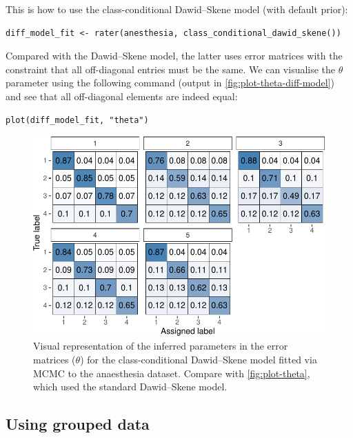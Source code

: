 This is how to use the class-conditional Dawid--Skene model (with default prior):

\begin{verbatim}
diff_model_fit <- rater(anesthesia, class_conditional_dawid_skene())
\end{verbatim}

Compared with the Dawid--Skene model, the latter uses error matrices with the
constraint that all off-diagonal entries must be the same. We can visualise
the \(\theta\) parameter using the following command (output in
\autoref{fig:plot-theta-diff-model}) and see that all off-diagonal elements are
indeed equal:

\begin{verbatim}
plot(diff_model_fit, "theta")
\end{verbatim}

\begin{figure}

{\centering \includegraphics{RJ-2023-064_files/figure-latex/plot-theta-diff-model-1} 

}

\caption{Visual representation of the inferred parameters in the error matrices ($\theta$) for the class-conditional Dawid--Skene model fitted via MCMC to the anaesthesia dataset.  Compare with \autoref{fig:plot-theta}, which used the standard Dawid--Skene model.}\label{fig:plot-theta-diff-model}
\end{figure}

\hypertarget{sec:using-grouped-data}{%
\subsection{Using grouped data}\label{sec:using-grouped-data}}

